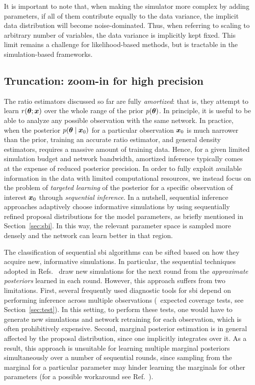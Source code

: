 It is important to note that, when making the simulator more complex by adding parameters, if all of them contribute equally to the data variance, the implicit data distribution will become noise-dominated. Thus, when referring to scaling to arbitrary number of variables, the data variance is implicitly kept fixed. This limit remains a challenge for likelihood-based methods, but is tractable in the simulation-based frameworks.


\subsection{Truncation: zoom-in for high precision} \label{subsec:tmnre-t}

 The ratio estimators discussed so far are fully \emph{amortized}: that is, they attempt to learn $r(\bm{\theta}; \bm{x})$ over the whole range of the prior $p(\bm{\theta})$. In principle, it is useful to be able to analyze any possible observation with the same network. In practice, when the posterior $p(\bm{\theta} \mid \bm{x}_0)$ for a particular observation $\bm{x}_0$ is much narrower than the prior, training an accurate ratio estimator, and general density estimators, requires a massive amount of training data. Hence, for a given limited simulation budget and network bandwidth, amortized inference typically comes at the expense of reduced posterior precision. In order to fully exploit available information in the data with limited computational resources, we instead focus on the problem of \emph{targeted learning} of the posterior for a specific observation of interest $\bm{x}_0$ through \emph{sequential inference}. In a nutshell, sequential inference approaches adaptively choose informative simulations by using sequentially refined proposal distributions for the model parameters, as briefly mentioned in Section~\ref{sec:sbi}. In this way, the relevant parameter space is sampled more densely and the network can learn better in that region.

The classification of sequential \gls*{sbi} algorithms can be sifted based on how they acquire new, informative simulations. In particular, the sequential techniques adopted in Refs.~\cite{Papamakarios:2016ctj, Lueckmann:2017aa, Greenberg:2019aa, Papamakarios:2018aa, Hermans:2019ioj, Durkan:2020aa} draw new simulations for the next round from the \emph{approximate posteriors} learned in each round. However, this approach suffers from two limitations. First, several frequently used diagnostic tools for \gls*{sbi} depend on performing inference across multiple observations (\eg~expected coverage tests, see Section~\ref{sec:test}). In this setting, to perform these tests, one would have to generate new simulations and network retraining for each observation, which is often prohibitively expensive. Second, marginal posterior estimation is in general affected by the proposal distribution, since one implicitly integrates over it. As a result, this approach is unsuitable for learning multiple marginal posteriors simultaneously over a number of sequential rounds, since sampling from the marginal for a particular parameter may hinder learning the marginals for other parameters (for a possible workaround see Ref.~\cite{Alsing:2019xrx}).


